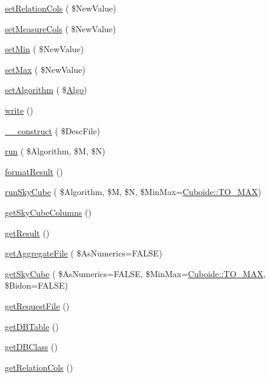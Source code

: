 \begin{DoxyCompactItemize}
\hyperlink{class_analysis_a860325e3da00ea1d669f0d458b66be5f}{set\+Relation\+Cols} ( \$New\+Value)
\item 
\hyperlink{class_analysis_ab4f8d5dc30e551e9687dc5021b824f45}{set\+Measure\+Cols} ( \$New\+Value)
\item 
\hyperlink{class_analysis_a06b88090a4e8a9d54f9e021caa5e74e1}{set\+Min} ( \$New\+Value)
\item 
\hyperlink{class_analysis_a0976a610f18b52541a363262e98956a7}{set\+Max} ( \$New\+Value)
\item 
\hyperlink{class_analysis_a0d88be05d67466f6fa98b5b0dcc38691}{set\+Algorithm} ( \$\hyperlink{class_algo}{Algo})
\item 
\hyperlink{class_analysis_a809e7010f2899e515a43f8c8840a1e86}{write} ()
\item 
\hyperlink{class_analysis_aec383f4c92d9c98bcbe496194bb416f0}{\+\_\+\+\_\+construct} ( \$Desc\+File)
\item 
\hyperlink{class_analysis_ac77d374d171fd92c5f693a04feff456b}{run} ( \$Algorithm, \$M, \$N)
\item 
\hyperlink{class_analysis_a34fc5d25df77ec67c0183d3b59868e0b}{format\+Result} ()
\item 
\hyperlink{class_analysis_a650bcf73f24eb914df10c9185ca40c67}{run\+Sky\+Cube} ( \$Algorithm, \$M, \$N, \$Min\+Max=\hyperlink{class_cuboide_afd49ea48fafb0362d27f78f6f4ef8b84}{Cuboide\+::\+T\+O\+\_\+\+M\+AX})
\item 
\hyperlink{class_analysis_aa72f4d177d42a08267acf6442d9dd901}{get\+Sky\+Cube\+Columns} ()
\item 
\hyperlink{class_analysis_ad7ad2fad370d3fa72512d3846f33618d}{get\+Result} ()
\item 
\hyperlink{class_analysis_a3a36df8e0acaa0d84d66483f395a913c}{get\+Aggregate\+File} ( \$As\+Numerics=F\+A\+L\+SE)
\item 
\hyperlink{class_analysis_aad6affe3bbce3e477cf3b33933f492d1}{get\+Sky\+Cube} ( \$As\+Numerics=F\+A\+L\+SE, \$Min\+Max=\hyperlink{class_cuboide_afd49ea48fafb0362d27f78f6f4ef8b84}{Cuboide\+::\+T\+O\+\_\+\+M\+AX}, \$Bidon=F\+A\+L\+SE)
\item 
\hyperlink{class_analysis_a162e4c51057c935b438264abe15feb24}{get\+Request\+File} ()
\item 
\hyperlink{class_analysis_aac54f4f73bcd61b1472f22e0dbd0ea46}{get\+D\+B\+Table} ()
\item 
\hyperlink{class_analysis_ac2da7aa0c6cb2b44acf3f4551ffc1b69}{get\+D\+B\+Class} ()
\item 
\hyperlink{class_analysis_a90b84a8fb6cf7b7dbd06ce835300e69c}{get\+Relation\+Cols} ()

\end{DoxyCompactItemize}
